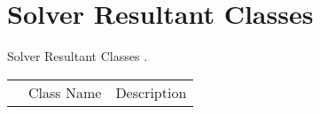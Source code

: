 \chapter{Solver Resultant Classes}
Solver Resultant Classes     .
\begin{longtable}{llp{8cm}}
& Class Name & Description \\
\end{longtable}
